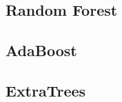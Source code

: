 \newpage  
\subsection{Random Forest}\label{random_forest}

 
\newpage
\subsection{AdaBoost}

\newpage
\subsection{ExtraTrees}